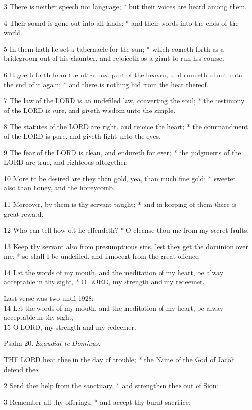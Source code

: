 3 There is neither speech nor language; * but their
voices are heard among them.

4 Their sound is gone out into all lands; * and their
words into the ends of the world.

5 In them hath he set a tabernacle for the sun; * which
cometh forth as a bridegroom out of his chamber, and rejoiceth as a giant
to run his course.

6 It goeth forth from the uttermost part of the heaven,
and runneth about unto the end of it again; * and there is nothing hid
from the heat thereof.

7 The law of the LORD is an
undefiled law, converting the soul; * the testimony of the LORD
is sure, and giveth wisdom unto the simple.

8 The statutes of the LORD are
right, and rejoice the heart; * the commandment of the LORD
is pure, and giveth light unto the eyes.

9 The fear of the LORD is clean,
and endureth for ever; * the judgments of the LORD
are true, and righteous altogether.

10 More to be desired are they than gold, yea, than
much fine gold; * sweeter also than honey, and the honeycomb.

11 Moreover, by them is thy servant taught; * and in
keeping of them there is great reward.

12 Who can tell how oft he offendeth? * O cleanse thou
me from my secret faults.

13 Keep thy servant also from presumptuous sins, lest
they get the dominion over me; * so shall I be undefiled, and innocent
from the great offence.

14 Let the words of my mouth, and the meditation of
my heart, be alway acceptable in thy sight, * O LORD,
my strength and my redeemer.

Last
verse was two until 1928:\\
14 Let the words
of my mouth, and the meditation of my heart, be alway acceptable in thy
sight,\\
15 O LORD, my strength
and my redeemer.

Psalm
20. \emph{Exaudiat te Dominus.}

THE
LORD hear thee in the day of trouble; * the Name
of the God of Jacob defend thee:

2 Send thee help from the sanctuary, * and strengthen
thee out of Sion:

3 Remember all thy offerings, * and accept thy burnt-sacrifice:

